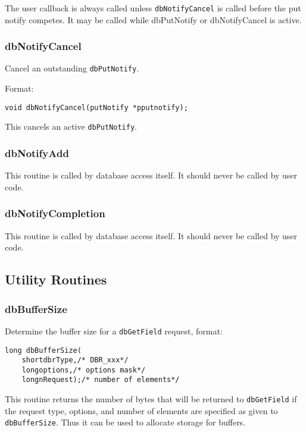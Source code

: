 The user callback is always called unless \verb|dbNotifyCancel| is called before the put notify competes.
It may be called while dbPutNotify or dbNotifyCancel is active.

\subsubsection{dbNotifyCancel}

Cancel an outstanding \verb|dbPutNotify|.

Format:

\begin{verbatim}
void dbNotifyCancel(putNotify *pputnotify);
\end{verbatim}

This cancels an active \verb|dbPutNotify|.

\subsubsection{dbNotifyAdd}

This routine is called by database access itself.
It should never be called by user code.

\subsubsection{dbNotifyCompletion}

This routine is called by database access itself.
It should never be called by user code.

\subsection{Utility Routines}

\subsubsection{dbBufferSize}

Determine the buffer size for a \verb|dbGetField| request, format:

\begin{verbatim}
long dbBufferSize(
    shortdbrType,/* DBR_xxx*/
    longoptions,/* options mask*/
    longnRequest);/* number of elements*/
\end{verbatim}

This routine returns the number of bytes that will be returned to \verb|dbGetField| if the request type, options, and number of elements are specified as given to \verb|dbBufferSize|.
Thus it can be used to allocate storage for buffers.

